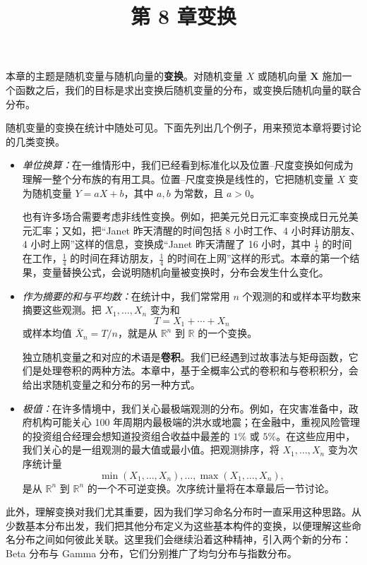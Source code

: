 \documentclass[UTF8, 12pt, fontset=fandol, oneside]{ctexart}
\title{第 8 章\quad 变换}
\author{}
\date{}
\begin{document}
\maketitle

本章的主题是随机变量与随机向量的\textbf{变换}。对随机变量 $X$ 或随机向量 $\mathbf X$ 施加一个函数之后，我们的目标是求出变换后随机变量的分布，或变换后随机向量的联合分布。

随机变量的变换在统计中随处可见。下面先列出几个例子，用来预览本章将要讨论的几类变换。

\begin{itemize}
  \item \textit{单位换算：}在一维情形中，我们已经看到标准化以及位置--尺度变换如何成为理解一整个分布族的有用工具。位置--尺度变换是线性的，它把随机变量 $X$ 变为随机变量 $Y=aX+b$，其中 $a,b$ 为常数，且 $a>0$。

  也有许多场合需要考虑非线性变换。例如，把美元兑日元汇率变换成日元兑美元汇率；又如，把“Janet 昨天清醒的时间包括 8 小时工作、4 小时拜访朋友、4 小时上网”这样的信息，变换成“Janet 昨天清醒了 16 小时，其中 $\frac12$ 的时间在工作，$\frac14$ 的时间在拜访朋友，$\frac14$ 的时间在上网”这样的形式。本章的第一个结果，变量替换公式，会说明随机向量被变换时，分布会发生什么变化。

  \item \textit{作为摘要的和与平均数：}在统计中，我们常常用 $n$ 个观测的和或样本平均数来摘要这些观测。把 $X_1,\ldots,X_n$ 变为和
  \[
    T=X_1+\cdots+X_n
  \]
  或样本均值 $\bar X_n=T/n$，就是从 $\mathbb R^n$ 到 $\mathbb R$ 的一个变换。

  独立随机变量之和对应的术语是\textbf{卷积}。我们已经遇到过故事法与矩母函数，它们是处理卷积的两种方法。本章中，基于全概率公式的卷积和与卷积积分，会给出求随机变量之和分布的另一种方式。

  \item \textit{极值：}在许多情境中，我们关心最极端观测的分布。例如，在灾害准备中，政府机构可能关心 100 年周期内最极端的洪水或地震；在金融中，重视风险管理的投资组合经理会想知道投资组合收益中最差的 $1\%$ 或 $5\%$。在这些应用中，我们关心的是一组观测的最大值或最小值。把观测排序，将 $X_1,\ldots,X_n$ 变为次序统计量
  \[
    \min(X_1,\ldots,X_n),\ldots,\max(X_1,\ldots,X_n),
  \]
  是从 $\mathbb R^n$ 到 $\mathbb R^n$ 的一个不可逆变换。次序统计量将在本章最后一节讨论。
\end{itemize}

此外，理解变换对我们尤其重要，因为我们学习命名分布时一直采用这种思路。从少数基本分布出发，我们把其他分布定义为这些基本构件的变换，以便理解这些命名分布之间如何彼此关联。这里我们会继续沿着这种精神，引入两个新的分布：Beta 分布与 Gamma 分布，它们分别推广了均匀分布与指数分布。
\end{document}
